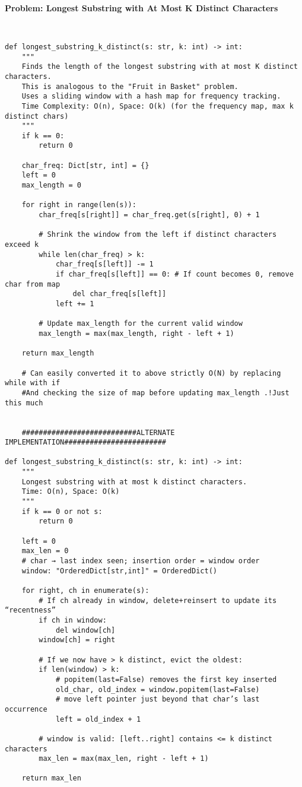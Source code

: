 \noindent\textbf{Problem: Longest Substring with At Most K Distinct Characters}
\begin{verbatim}


def longest_substring_k_distinct(s: str, k: int) -> int:
    """
    Finds the length of the longest substring with at most K distinct characters.
    This is analogous to the "Fruit in Basket" problem. 
    Uses a sliding window with a hash map for frequency tracking. 
    Time Complexity: O(n), Space: O(k) (for the frequency map, max k distinct chars)
    """
    if k == 0:
        return 0
    
    char_freq: Dict[str, int] = {}
    left = 0
    max_length = 0

    for right in range(len(s)):
        char_freq[s[right]] = char_freq.get(s[right], 0) + 1
        
        # Shrink the window from the left if distinct characters exceed k
        while len(char_freq) > k:
            char_freq[s[left]] -= 1
            if char_freq[s[left]] == 0: # If count becomes 0, remove char from map
                del char_freq[s[left]]
            left += 1
        
        # Update max_length for the current valid window
        max_length = max(max_length, right - left + 1)
        
    return max_length

    # Can easily converted it to above strictly O(N) by replacing while with if
    #And checking the size of map before updating max_length .!Just this much


    ###########################ALTERNATE IMPLEMENTATION########################

def longest_substring_k_distinct(s: str, k: int) -> int:
    """
    Longest substring with at most k distinct characters.
    Time: O(n), Space: O(k)
    """
    if k == 0 or not s:
        return 0

    left = 0
    max_len = 0
    # char → last index seen; insertion order = window order
    window: "OrderedDict[str,int]" = OrderedDict()

    for right, ch in enumerate(s):
        # If ch already in window, delete+reinsert to update its “recentness”
        if ch in window:
            del window[ch]
        window[ch] = right

        # If we now have > k distinct, evict the oldest:
        if len(window) > k:
            # popitem(last=False) removes the first key inserted
            old_char, old_index = window.popitem(last=False)
            # move left pointer just beyond that char’s last occurrence
            left = old_index + 1

        # window is valid: [left..right] contains <= k distinct characters
        max_len = max(max_len, right - left + 1)

    return max_len

\end{verbatim}

